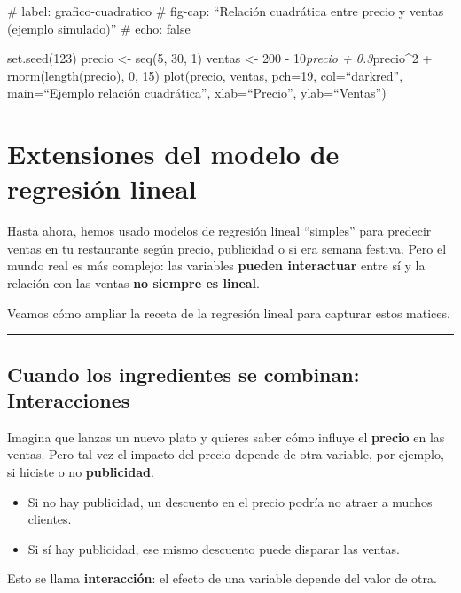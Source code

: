 \documentclass[
  spanish,
  letterpaper,
  DIV=11,
  numbers=noendperiod]{scrreprt}
\providecommand{\tightlist}{%
  \setlength{\itemsep}{0pt}\setlength{\parskip}{0pt}}
\begin{document}
\#\textbar{} label: grafico-cuadratico \#\textbar{} fig-cap: ``Relación
cuadrática entre precio y ventas (ejemplo simulado)'' \#\textbar{} echo:
false

set.seed(123) precio \textless- seq(5, 30, 1) ventas \textless- 200 -
10\emph{precio + 0.3}precio\^{}2 + rnorm(length(precio), 0, 15)
plot(precio, ventas, pch=19, col=``darkred'', main=``Ejemplo relación
cuadrática'', xlab=``Precio'', ylab=``Ventas'')


\chapter{Extensiones del modelo de regresión
lineal}\label{extensiones-del-modelo-de-regresiuxf3n-lineal-1}

Hasta ahora, hemos usado modelos de regresión lineal ``simples'' para
predecir ventas en tu restaurante según precio, publicidad o si era
semana festiva. Pero el mundo real es más complejo: las variables
\textbf{pueden interactuar} entre sí y la relación con las ventas
\textbf{no siempre es lineal}.

Veamos cómo ampliar la receta de la regresión lineal para capturar estos
matices.

\begin{center}\rule{0.5\linewidth}{0.5pt}\end{center}

\section{Cuando los ingredientes se combinan:
Interacciones}\label{cuando-los-ingredientes-se-combinan-interacciones-1}

Imagina que lanzas un nuevo plato y quieres saber cómo influye el
\textbf{precio} en las ventas. Pero tal vez el impacto del precio
depende de otra variable, por ejemplo, si hiciste o no
\textbf{publicidad}.

\begin{itemize}
\tightlist
\item
  Si no hay publicidad, un descuento en el precio podría no atraer a
  muchos clientes.\\
\item
  Si sí hay publicidad, ese mismo descuento puede disparar las ventas.
\end{itemize}

Esto se llama \textbf{interacción}: el efecto de una variable depende
del valor de otra.
\end{document}
